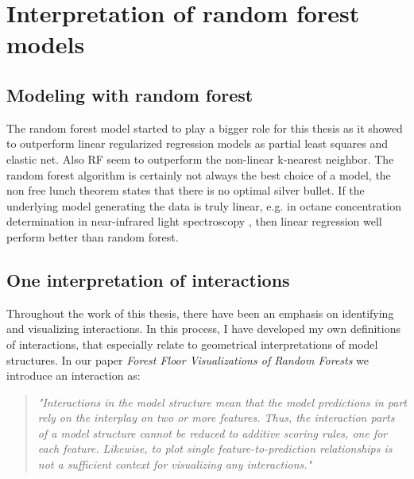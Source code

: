 \chapter{Interpretation of random forest models}

\section{Modeling with random forest}
The random forest model started to play a bigger role for this thesis as it showed to outperform linear regularized regression models as partial least squares and elastic net. Also RF seem to outperform the non-linear k-nearest neighbor. The random forest algorithm is certainly not always the best choice of a model, the non free lunch theorem states that there is no optimal silver bullet. If the underlying model generating the data is truly linear, e.g. in octane concentration determination in near-infrared light spectroscopy \cite{kalivas1997two}, then linear regression well perform better than random forest.


\section{One interpretation of interactions}
\label{defineInteractions}
Throughout the work of this thesis, there have been an emphasis on identifying and visualizing interactions. In this process, I have developed my own definitions of interactions, that especially relate to geometrical interpretations of model structures. In our paper \textit{Forest Floor Visualizations of Random Forests} we introduce an interaction as:

\begin{quotation}
\textit{
"Interactions in the model structure mean that the model predictions in part rely on the interplay on two or more features. Thus, the interaction parts of a model structure cannot be reduced to additive scoring rules, one for each feature. Likewise, to plot single feature-to-prediction relationships is not a sufficient context for visualizing any interactions."
}
\cite{welling2016forest}
\end{quotation}

